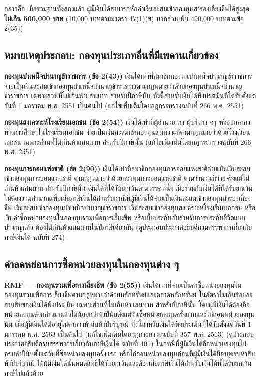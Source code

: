 \documentclass[12pt,a4paper]{article}
\newcommand{\hilight}[1]{\textbf{#1}}
\begin{document}
กล่าวคือ เมื่อรวมฐานทั้งสองแล้ว ผู้มีเงินได้สามารถหักค่าเงินสะสมเข้ากองทุนสำรองเลี้ยงชีพได้สูงสุด \hilight{ไม่เกิน 500,000 บาท} (10,000 บาทตามมาตรา 47(1)(ช) บวกส่วนเพิ่ม 490,000 บาทตามข้อ 2(35))

\subsection*{หมายเหตุประกอบ: กองทุนประเภทอื่นที่มีเพดานเกี่ยวข้อง}

\textbf{กองทุนบำเหน็จบำนาญข้าราชการ (ข้อ 2(43))} เงินได้เท่าที่สมาชิกกองทุนบำเหน็จบำนาญข้าราชการจ่ายเป็นเงินสะสมเข้ากองทุนบำเหน็จบำนาญข้าราชการตามกฎหมายว่าด้วยกองทุนบำเหน็จบำนาญข้าราชการ เฉพาะส่วนที่ไม่เกินห้าแสนบาท สำหรับปีภาษีนั้น ทั้งนี้สำหรับเงินได้พึงประเมินที่ได้รับตั้งแต่วันที่ 1 มกราคม พ.ศ. 2551 เป็นต้นไป (แก้ไขเพิ่มเติมโดยกฎกระทรวงฉบับที่ 266 พ.ศ. 2551)

\textbf{กองทุนสงเคราะห์โรงเรียนเอกชน (ข้อ 2(54))} เงินได้เท่าที่ผู้อำนวยการ ผู้บริหาร ครู หรือบุคลากรทางการศึกษาในโรงเรียนเอกชน จ่ายเป็นเงินสะสมเข้ากองทุนสงเคราะห์ตามกฎหมายว่าด้วยโรงเรียนเอกชน เฉพาะส่วนที่ไม่เกินห้าแสนบาท สำหรับปีภาษีนั้น (แก้ไขเพิ่มเติมโดยกฎกระทรวงฉบับที่ 266 พ.ศ. 2551)

\textbf{กองทุนการออมแห่งชาติ (ข้อ 2(90))} เงินได้เท่าที่สมาชิกกองทุนการออมแห่งชาติจ่ายเป็นเงินสะสมเข้ากองทุนการออมแห่งชาติ ตามกฎหมายว่าด้วยกองทุนการออมแห่งชาติ ตามจำนวนที่จ่ายจริงแต่ไม่เกินห้าแสนบาท สำหรับปีภาษีนั้น เงินได้ที่ได้รับยกเว้นตามวรรคหนึ่ง เมื่อรวมกับเงินได้ที่ได้รับยกเว้นไม่ต้องรวมคำนวณเพื่อเสียภาษีเงินได้สำหรับกรณีที่ผู้มีเงินได้จ่ายเป็นเงินสะสมเข้ากองทุนสำรองเลี้ยงชีพ เงินสะสมเข้ากองทุนบำเหน็จบำนาญข้าราชการ เงินสะสมเข้ากองทุนสงเคราะห์โรงเรียนเอกชน หรือเงินค่าซื้อหน่วยลงทุนในกองทุนรวมเพื่อการเลี้ยงชีพ หรือเบี้ยประกันภัยสำหรับการประกันชีวิตแบบบำนาญแล้ว ต้องไม่เกินห้าแสนบาทในปีภาษีเดียวกัน (ดูประกอบประกาศอธิบดีกรมสรรพากรเกี่ยวกับภาษีเงินได้ ฉบับที่ 274)

\subsection*{ค่าลดหย่อนการซื้อหน่วยลงทุนในกองทุนต่าง ๆ}

\textbf{RMF --- กองทุนรวมเพื่อการเลี้ยงชีพ (ข้อ 2(55))} เงินได้เท่าที่จ่ายเป็นค่าซื้อหน่วยลงทุนในกองทุนรวมเพื่อการเลี้ยงชีพตามกฎหมายว่าด้วยหลักทรัพย์และตลาดหลักทรัพย์ ในอัตราไม่เกินร้อยละสามสิบของเงินได้พึงประเมิน เฉพาะส่วนที่ไม่เกินห้าแสนบาท สำหรับปีภาษีนั้น โดยผู้มีเงินได้ต้องถือหน่วยลงทุนดังกล่าวมาแล้วไม่น้อยกว่าห้าปีนับตั้งแต่วันซื้อหน่วยลงทุนครั้งแรกและไถ่ถอนหน่วยลงทุนนั้น เมื่อผู้มีเงินได้มีอายุไม่ต่ำกว่าห้าสิบห้าปีบริบูรณ์ ทั้งนี้สำหรับเงินได้พึงประเมินที่ได้รับตั้งแต่วันที่ 1 มกราคม พ.ศ. 2563 เป็นต้นไป (แก้ไขเพิ่มเติมโดยกฎกระทรวงฉบับที่ 357 พ.ศ. 2563) (ดูประกอบประกาศอธิบดีกรมสรรพากรเกี่ยวกับภาษีเงินได้ ฉบับที่ 401) ในกรณีที่ผู้มีเงินได้ถือหน่วยลงทุนไม่ครบห้าปีนับตั้งแต่วันที่ซื้อหน่วยลงทุนครั้งแรก หรือไถ่ถอนหน่วยลงทุนก่อนที่ผู้มีเงินได้มีอายุครบห้าสิบห้าปีบริบูรณ์ ให้ผู้มีเงินได้นั้นหมดสิทธิได้รับยกเว้นและต้องเสียภาษีเงินได้สำหรับเงินได้ที่ได้รับยกเว้นภาษีไปแล้วด้วย
\end{document}
